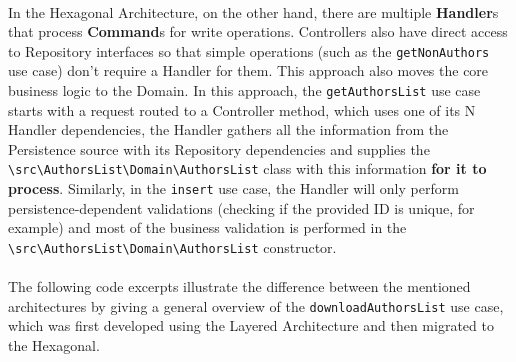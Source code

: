 \paragraph{} In the Hexagonal Architecture, on the other hand, there are multiple \textbf{Handler}s that process \textbf{Command}s for write operations. Controllers also have direct access to Repository interfaces so that simple operations (such as the \verb|getNonAuthors| use case) don't require a Handler for them. This approach also moves the core business logic to the Domain. In this approach, the \verb|getAuthorsList| use case starts with a request routed to a Controller method, which uses one of its N Handler dependencies, the Handler gathers all the information from the Persistence source with its Repository dependencies and supplies the \verb|\src\AuthorsList\Domain\AuthorsList| class with this information \textbf{for it to process}. Similarly, in the \verb|insert| use case, the Handler will only perform persistence-dependent validations (checking if the provided ID is unique, for example) and most of the business validation is performed in the \verb|\src\AuthorsList\Domain\AuthorsList| constructor.

\paragraph{} The following code excerpts illustrate the difference between the mentioned architectures by giving a general overview of the \verb|downloadAuthorsList| use case, which was first developed using the Layered Architecture and then migrated to the Hexagonal.

